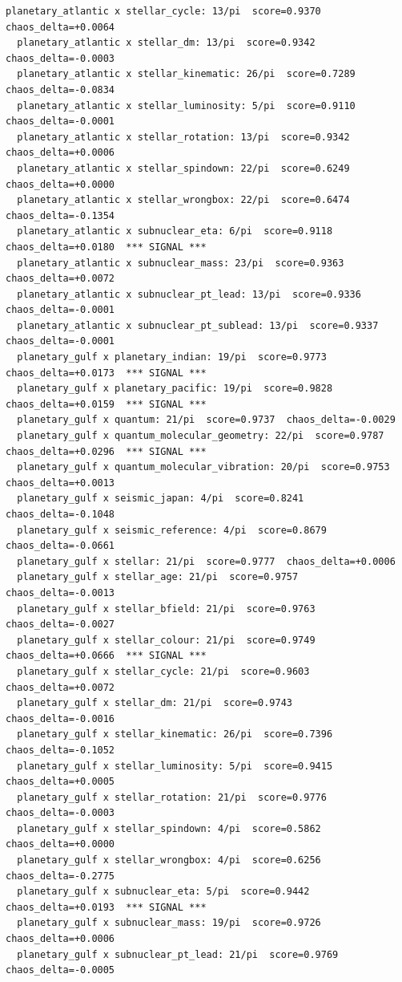 \documentclass[11pt, letterpaper, openany]{book}
\begin{document}
\begin{empiricalbox}
\begin{lstlisting}[style=terminal]
  planetary_atlantic x stellar_cycle: 13/pi  score=0.9370  chaos_delta=+0.0064
  planetary_atlantic x stellar_dm: 13/pi  score=0.9342  chaos_delta=-0.0003
  planetary_atlantic x stellar_kinematic: 26/pi  score=0.7289  chaos_delta=-0.0834
  planetary_atlantic x stellar_luminosity: 5/pi  score=0.9110  chaos_delta=-0.0001
  planetary_atlantic x stellar_rotation: 13/pi  score=0.9342  chaos_delta=+0.0006
  planetary_atlantic x stellar_spindown: 22/pi  score=0.6249  chaos_delta=+0.0000
  planetary_atlantic x stellar_wrongbox: 22/pi  score=0.6474  chaos_delta=-0.1354
  planetary_atlantic x subnuclear_eta: 6/pi  score=0.9118  chaos_delta=+0.0180  *** SIGNAL ***
  planetary_atlantic x subnuclear_mass: 23/pi  score=0.9363  chaos_delta=+0.0072
  planetary_atlantic x subnuclear_pt_lead: 13/pi  score=0.9336  chaos_delta=-0.0001
  planetary_atlantic x subnuclear_pt_sublead: 13/pi  score=0.9337  chaos_delta=-0.0001
  planetary_gulf x planetary_indian: 19/pi  score=0.9773  chaos_delta=+0.0173  *** SIGNAL ***
  planetary_gulf x planetary_pacific: 19/pi  score=0.9828  chaos_delta=+0.0159  *** SIGNAL ***
  planetary_gulf x quantum: 21/pi  score=0.9737  chaos_delta=-0.0029
  planetary_gulf x quantum_molecular_geometry: 22/pi  score=0.9787  chaos_delta=+0.0296  *** SIGNAL ***
  planetary_gulf x quantum_molecular_vibration: 20/pi  score=0.9753  chaos_delta=+0.0013
  planetary_gulf x seismic_japan: 4/pi  score=0.8241  chaos_delta=-0.1048
  planetary_gulf x seismic_reference: 4/pi  score=0.8679  chaos_delta=-0.0661
  planetary_gulf x stellar: 21/pi  score=0.9777  chaos_delta=+0.0006
  planetary_gulf x stellar_age: 21/pi  score=0.9757  chaos_delta=-0.0013
  planetary_gulf x stellar_bfield: 21/pi  score=0.9763  chaos_delta=-0.0027
  planetary_gulf x stellar_colour: 21/pi  score=0.9749  chaos_delta=+0.0666  *** SIGNAL ***
  planetary_gulf x stellar_cycle: 21/pi  score=0.9603  chaos_delta=+0.0072
  planetary_gulf x stellar_dm: 21/pi  score=0.9743  chaos_delta=-0.0016
  planetary_gulf x stellar_kinematic: 26/pi  score=0.7396  chaos_delta=-0.1052
  planetary_gulf x stellar_luminosity: 5/pi  score=0.9415  chaos_delta=+0.0005
  planetary_gulf x stellar_rotation: 21/pi  score=0.9776  chaos_delta=-0.0003
  planetary_gulf x stellar_spindown: 4/pi  score=0.5862  chaos_delta=+0.0000
  planetary_gulf x stellar_wrongbox: 4/pi  score=0.6256  chaos_delta=-0.2775
  planetary_gulf x subnuclear_eta: 5/pi  score=0.9442  chaos_delta=+0.0193  *** SIGNAL ***
  planetary_gulf x subnuclear_mass: 19/pi  score=0.9726  chaos_delta=+0.0006
  planetary_gulf x subnuclear_pt_lead: 21/pi  score=0.9769  chaos_delta=-0.0005

\end{lstlisting}
\end{empiricalbox}
\end{document}
